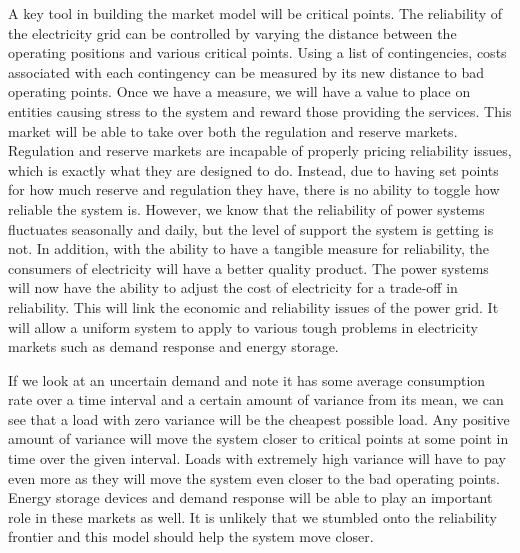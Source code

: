 A key tool in building the market model will be critical points. The reliability of the electricity grid can be controlled by varying the distance between the operating positions and various critical points.  Using a list of contingencies, costs associated with each contingency can be measured by its new distance to bad operating points.  Once we have a measure, we will have a value to place on entities causing stress to the system and reward those providing the services.  This market will be able to take over both the regulation and reserve markets.  Regulation and reserve markets are incapable of properly pricing reliability issues, which is exactly what they are designed to do.  Instead, due to having set points for how much reserve and regulation they have, there is no ability to toggle how reliable the system is.  However, we know that the reliability of power systems fluctuates seasonally and daily, but the level of support the system is getting is not.  In addition, with the ability to have a tangible measure for reliability, the consumers of electricity will have a better quality product.  The power systems will now have the ability to adjust the cost of electricity for a trade-off in reliability.  This will link the economic and reliability issues of the power grid.  It will allow a uniform system to apply to various tough problems in electricity markets such as demand response and energy storage.

If we look at an uncertain demand and note it has some average consumption rate over a time interval and a certain amount of variance from its mean, we can see that a load with zero variance will be the cheapest possible load.  Any positive amount of variance will move the system closer to critical points at some point in time over the given interval.  Loads with extremely high variance will have to pay even more as they will move the system even closer to the bad operating points.  Energy storage devices and demand response will be able to play an important role in these markets as well.  It is unlikely that we stumbled onto the reliability frontier and this model should help the system move closer.  

